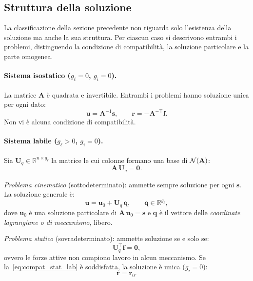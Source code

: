 \subsection{Struttura della soluzione}
\label{sec:struttura_soluzione}

La classificazione della sezione precedente non riguarda solo
l'esistenza della soluzione ma anche la sua struttura. Per
ciascun caso si descrivono entrambi i problemi, distinguendo
la condizione di compatibilità, la soluzione particolare e
la parte omogenea.

\paragraph{Sistema isostatico ($g_\ell = 0$,
	$g_i = 0$).}
La matrice $\bm{A}$ è quadrata e invertibile. Entrambi i
problemi hanno soluzione unica per ogni dato:
\begin{equation}\label{eq:sol_iso}
	\bm{u} = \bm{A}^{-1}\bm{s},
	\qquad
	\bm{r} = -\bm{A}^{-\top}\bm{f}.
\end{equation}
Non vi è alcuna condizione di compatibilità.

\paragraph{Sistema labile ($g_\ell > 0$,
	$g_i = 0$).}
Sia $\bm{U}_q \in \mathbb{R}^{n \times g_\ell}$ la matrice
le cui colonne formano una base di $\mathcal{N}(\mathbf{A})$:
\begin{equation}\label{eq:ker_A_lab}
	\bm{A}\,\bm{U}_q = \bm{0}.
\end{equation}

\noindent\emph{Problema cinematico} (sottodeterminato):
ammette sempre soluzione per ogni $\bm{s}$. La soluzione
generale è:
\begin{equation}\label{eq:sol_lab_cin}
	\bm{u} = \bm{u}_0 + \bm{U}_q\,\bm{q},
	\qquad \bm{q} \in \mathbb{R}^{g_\ell},
\end{equation}
dove $\bm{u}_0$ è una soluzione particolare di
$\bm{A}\,\bm{u}_0 = \bm{s}$ e $\bm{q}$ è il vettore
delle \emph{coordinate lagrangiane o di meccanismo}, libero.

\noindent\emph{Problema statico} (sovradeterminato):
ammette soluzione se e solo se:
\begin{equation}\label{eq:compat_stat_lab}
	\bm{U}_q^{\top}\bm{f} = \bm{0},
\end{equation}
ovvero le forze attive non compiono lavoro in alcun
meccanismo. Se la~\eqref{eq:compat_stat_lab} è soddisfatta,
la soluzione è unica ($g_i = 0$):
\begin{equation}\label{eq:sol_lab_stat}
	\bm{r} = \bm{r}_0.
\end{equation}

